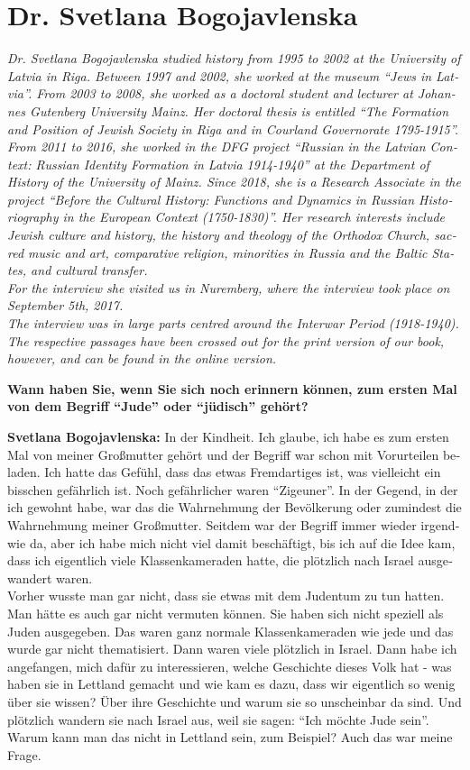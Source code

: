 \section{Dr. Svetlana Bogojavlenska}
\begin{otherlanguage}{ngerman}
\textit{Dr. Svetlana Bogojavlenska studied history from 1995 to 2002 at the University of Latvia in Riga. Between 1997 and 2002, she worked at the museum ``Jews in Latvia''. From 2003 to 2008, she worked as a doctoral student and lecturer at Johannes Gutenberg University Mainz. Her doctoral thesis is entitled ``The Formation and Position of Jewish Society in Riga and in Courland Governorate 1795-1915''. From 2011 to 2016, she worked in the DFG project ``Russian in the Latvian Context: Russian Identity Formation in Latvia 1914-1940'' at the Department of History of the University of Mainz. Since 2018, she is a Research Associate in the project ``Before the Cultural History: Functions and Dynamics in Russian Historiography in the European Context (1750-1830)''. Her research interests include Jewish culture and history, the history and theology of the Orthodox Church, sacred music and art, comparative religion, minorities in Russia and the Baltic States, and cultural transfer.\\
For the interview she visited us in Nuremberg, where the interview took place on September 5th, 2017. \\
The interview was in large parts centred around the Interwar Period (1918-1940). The respective passages have been crossed out for the print version of our book, however, and can be found in the online version.}\par
\vspace*{2em}
\textbf{Wann haben Sie, wenn Sie sich noch erinnern können, zum ersten Mal von dem Begriff "`Jude"' oder "`jüdisch"' gehört?}

\textbf{Svetlana Bogojavlenska:} In der Kindheit. Ich glaube, ich habe es zum ersten Mal von meiner Großmutter gehört und der Begriff war schon mit Vorurteilen beladen. Ich hatte das Gefühl, dass das etwas Fremdartiges ist, was vielleicht ein bisschen gefährlich ist. Noch gefährlicher waren "`Zigeuner"'. In der Gegend, in der ich gewohnt habe, war das die Wahrnehmung der Bevölkerung oder zumindest die Wahrnehmung meiner Großmutter. Seitdem war der Begriff immer wieder irgendwie da, aber ich habe mich nicht viel damit beschäftigt, bis ich auf die Idee kam, dass ich eigentlich viele Klassenkameraden hatte, die plötzlich nach Israel ausgewandert waren.\\
Vorher wusste man gar nicht, dass sie etwas mit dem Judentum zu tun hatten. Man hätte es auch gar nicht vermuten können. Sie haben sich nicht speziell als Juden ausgegeben. Das waren ganz normale Klassenkameraden wie jede und das wurde gar nicht thematisiert. Dann waren viele plötzlich in Israel. Dann habe ich angefangen, mich dafür zu interessieren, welche Geschichte dieses Volk hat - was haben sie in Lettland gemacht und wie kam es dazu, dass wir eigentlich so wenig über sie wissen? Über ihre Geschichte und warum sie so unscheinbar da sind. Und plötzlich wandern sie nach Israel aus, weil sie sagen: "`Ich möchte Jude sein"'. Warum kann man das nicht in Lettland sein, zum Beispiel? Auch das war meine Frage.


\end{otherlanguage}
